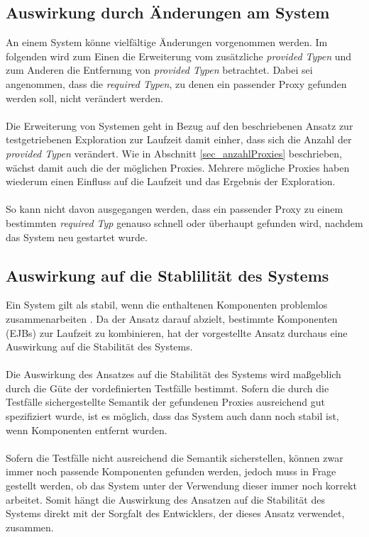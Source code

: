 \subsection{Auswirkung durch Änderungen am System}
An einem System könne vielfältige Änderungen vorgenommen werden. Im folgenden wird zum Einen die Erweiterung vom zusätzliche \emph{provided Typen} und zum Anderen die Entfernung von \emph{provided Typen} betrachtet. Dabei sei angenommen, dass die \emph{required Typen}, zu denen ein passender Proxy gefunden werden soll, nicht verändert werden.
\\\\
Die Erweiterung von Systemen geht in Bezug auf den beschriebenen Ansatz zur testgetriebenen Exploration zur Laufzeit damit einher, dass sich die Anzahl der \emph{provided Typen} verändert. Wie in Abschnitt \ref{sec_anzahlProxies} beschrieben, wächst damit auch die der möglichen Proxies. Mehrere mögliche Proxies haben wiederum einen Einfluss auf die Laufzeit und das Ergebnis der Exploration.
\\\\
So kann nicht davon ausgegangen werden, dass ein passender Proxy zu einem bestimmten \emph{required Typ} genauso schnell oder überhaupt gefunden wird, nachdem das System neu gestartet wurde.

\subsection{Auswirkung auf die Stablilität des Systems}
Ein System gilt als stabil, wenn die enthaltenen Komponenten problemlos zusammenarbeiten \cite{}. Da der Ansatz darauf abzielt, bestimmte Komponenten (EJBs) zur Laufzeit zu kombinieren, hat der vorgestellte Ansatz durchaus eine Auswirkung auf die Stabilität des Systems.
\\\\
Die Auswirkung des Ansatzes auf die Stabilität des Systems wird maßgeblich durch die Güte der vordefinierten Testfälle bestimmt. Sofern die durch die Testfälle sichergestellte Semantik der gefundenen Proxies ausreichend gut spezifiziert wurde, ist es möglich, dass das System auch dann noch stabil ist, wenn Komponenten entfernt wurden.
\\\\
Sofern die Testfälle nicht ausreichend die Semantik sicherstellen, können zwar immer noch passende Komponenten gefunden werden, jedoch muss in Frage gestellt werden, ob das System unter der Verwendung dieser immer noch korrekt arbeitet. Somit hängt die Auswirkung des Ansatzen auf die Stabilität des Systems direkt mit der Sorgfalt des Entwicklers, der dieses Ansatz verwendet, zusammen.

